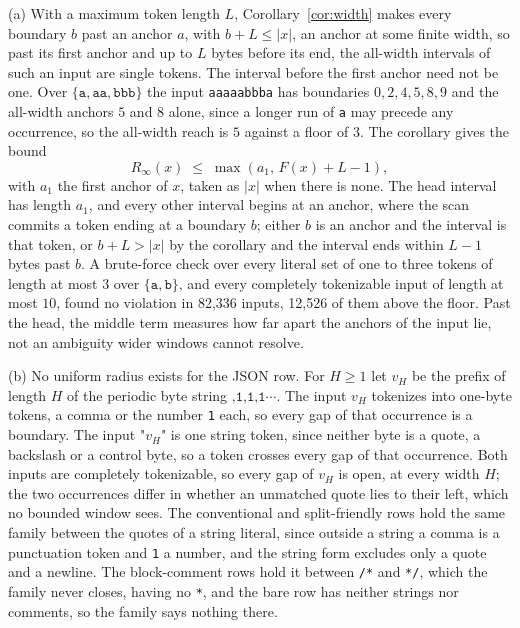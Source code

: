 \documentclass[11pt,a4paper]{article}
\theoremstyle{definition}
\theoremstyle{plain}
\newcommand{\code}[1]{\texttt{#1}}
\begin{document}
(a) With a maximum token length $L$, Corollary~\ref{cor:width} makes every boundary $b$ past an anchor $a$, with
$b + L \leq |x|$, an anchor at some finite width, so past its first anchor and up to $L$ bytes before its end, the
all-width intervals of such an input are single tokens. The interval before the first anchor need not be one. Over
$\{\code{a}, \code{aa}, \code{bbb}\}$ the input \code{aaaaabbba} has boundaries $0, 2, 4, 5, 8, 9$ and the all-width
anchors $5$ and $8$ alone, since a longer run of \code{a} may precede any occurrence, so the all-width reach is $5$
against a floor of $3$. The corollary gives the bound
\[ R_\infty(x) \;\leq\; \max(a_1,\, F(x) + L - 1), \]
with $a_1$ the first anchor of $x$, taken as $|x|$ when there is none. The head interval has length $a_1$, and every
other interval begins at an anchor, where the scan commits a token ending at a boundary $b$; either $b$ is an anchor and
the interval is that token, or $b + L > |x|$ by the corollary and the interval ends within $L - 1$ bytes past $b$. A
brute-force check over every literal set of one to three tokens of length at most $3$ over $\{\code{a}, \code{b}\}$, and
every completely tokenizable input of length at most $10$, found no violation in 82{,}336 inputs, 12{,}526 of them above
the floor. Past the head, the middle term measures how far apart the anchors of the input lie, not an ambiguity wider
windows cannot resolve.

(b) No uniform radius exists for the JSON row. For $H \geq 1$ let $v_H$ be the prefix of length $H$ of the periodic byte
string $\code{,1,1,1}\cdots$. The input $v_H$ tokenizes into one-byte tokens, a comma or the number \code{1} each, so
every gap of that occurrence is a boundary. The input $\code{"}v_H\code{"}$ is one string token, since neither byte is a
quote, a backslash or a control byte, so a token crosses every gap of that occurrence. Both inputs are completely
tokenizable, so every gap of $v_H$ is open, at every width $H$; the two occurrences differ in whether an unmatched quote
lies to their left, which no bounded window sees. The conventional and split-friendly rows hold the same family between
the quotes of a string literal, since outside a string a comma is a punctuation token and \code{1} a number, and the
string form excludes only a quote and a newline. The block-comment rows hold it between \code{/*} and \code{*/}, which
the family never closes, having no \code{*}, and the bare row has neither strings nor comments, so the family says
nothing there.
\end{document}
